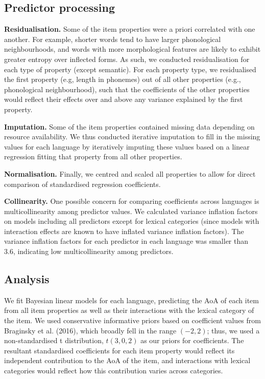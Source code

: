 \documentclass[10pt, letterpaper]{article}
\begin{document}
\hypertarget{predictor-processing}{%
\subsection{Predictor processing}\label{predictor-processing}}

\textbf{Residualisation.} Some of the item properties were a priori
correlated with one another. For example, shorter words tend to have
larger phonological neighbourhoods, and words with more morphological
features are likely to exhibit greater entropy over inflected forms. As
such, we conducted residualisation for each type of property (except
semantic). For each property type, we residualised the first property
(e.g, length in phonemes) out of all other properties (e.g.,
phonological neighbourhood), such that the coefficients of the other
properties would reflect their effects over and above any variance
explained by the first property.

\textbf{Imputation.} Some of the item properties contained missing data
depending on resource availability. We thus conducted iterative
imputation to fill in the missing values for each language by
iteratively imputing these values based on a linear regression fitting
that property from all other properties.

\textbf{Normalisation.} Finally, we centred and scaled all properties to
allow for direct comparison of standardised regression coefficients.

\textbf{Collinearity.} One possible concern for comparing coefficients
across languages is multicollinearity among predictor values. We
calculated variance inflation factors on models including all predictors
except for lexical categories (since models with interaction effects are
known to have inflated variance inflation factors). The variance
inflation factors for each predictor in each language was smaller than
3.6, indicating low multicollinearity among predictors.

\hypertarget{analysis}{%
\subsection{Analysis}\label{analysis}}

We fit Bayesian linear models for each language, predicting the AoA of
each item from all item properties as well as their interactions with
the lexical category of the item. We used conservative informative
priors based on coefficient values from Braginsky et al. (2016), which
broadly fell in the range \((-2, 2)\); thus, we used a non-standardised
t distribution, \(t(3, 0, 2)\) as our priors for coefficients. The
resultant standardised coefficients for each item property would reflect
its independent contribution to the AoA of the item, and interactions
with lexical categories would reflect how this contribution varies
across categories.
\end{document}

